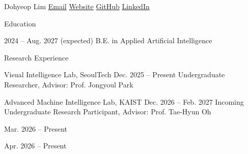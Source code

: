 \documentclass[11pt,a4paper]{article}
\begin{document}
\cvheader
  {Dohyeop Lim}
  {\href{mailto:dohyeoplim@seoultech.ac.kr}{Email}\cvsep
   \href{https://dohyeoplim.me/portfolio}{Website}\cvsep
   \href{https://github.com/dohyeoplim}{GitHub}\cvsep
   \href{https://www.linkedin.com/in/dohyeoplim/}{LinkedIn}}

\begin{cvsection}{Education}

\cventry
  {}
  {2024 -- Aug. 2027 (expected)}
  {B.E. in Applied Artificial Intelligence}


\end{cvsection}

\begin{cvsection}{Research Experience}

\begin{cvlab}
  {Visual Intelligence Lab, SeoulTech}
  {Dec. 2025 -- Present}
  {Undergraduate Researcher\normalfont, Advisor: Prof. Jongyoul Park}

\cvgroupgap

\begin{cvlab}
  {Advanced Machine Intelligence Lab, KAIST}
  {Dec. 2026 -- Feb. 2027}
  {Incoming Undergraduate Research Participant\normalfont, Advisor: Prof. Tae-Hyun Oh}
\end{cvlab}

\begin{cvlabprojects}

  {Mar. 2026 -- Present}

  {Apr. 2026 -- Present}

\end{cvlabprojects}
\end{cvlab}

\end{cvsection}
\end{document}
